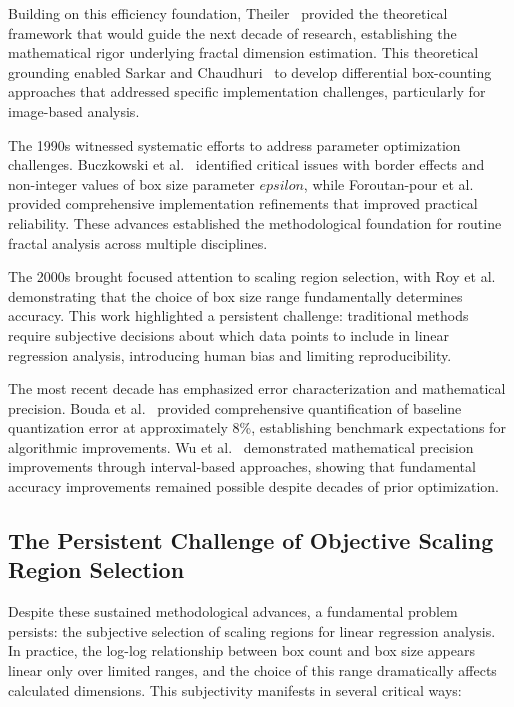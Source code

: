 \documentclass[preprint,12pt]{elsarticle}
\def\epsilon{epsilon}%
\begin{document}
Building on this efficiency foundation, Theiler~\cite{theiler1990} provided the theoretical framework that would guide the next decade of research, establishing the mathematical rigor underlying fractal dimension estimation. This theoretical grounding enabled Sarkar and Chaudhuri~\cite{sarkar1994} to develop differential box-counting approaches that addressed specific implementation challenges, particularly for image-based analysis.

The 1990s witnessed systematic efforts to address parameter optimization challenges. Buczkowski et al.~\cite{buczkowski1998} identified critical issues with border effects and non-integer values of box size parameter $\epsilon$, while Foroutan-pour et al.~\cite{foroutan1999} provided comprehensive implementation refinements that improved practical reliability. These advances established the methodological foundation for routine fractal analysis across multiple disciplines.

The 2000s brought focused attention to scaling region selection, with Roy et al.~\cite{roy2007} demonstrating that the choice of box size range fundamentally determines accuracy. This work highlighted a persistent challenge: traditional methods require subjective decisions about which data points to include in linear regression analysis, introducing human bias and limiting reproducibility.

The most recent decade has emphasized error characterization and mathematical precision. Bouda et al.~\cite{bouda2016} provided comprehensive quantification of baseline quantization error at approximately 8\%, establishing benchmark expectations for algorithmic improvements. Wu et al.~\cite{wu2020} demonstrated mathematical precision improvements through interval-based approaches, showing that fundamental accuracy improvements remained possible despite decades of prior optimization.

\subsection{The Persistent Challenge of Objective Scaling Region Selection}

Despite these sustained methodological advances, a fundamental problem persists: the subjective selection of scaling regions for linear regression analysis. In practice, the log-log relationship between box count and box size appears linear only over limited ranges, and the choice of this range dramatically affects calculated dimensions. This subjectivity manifests in several critical ways:
\end{document}

